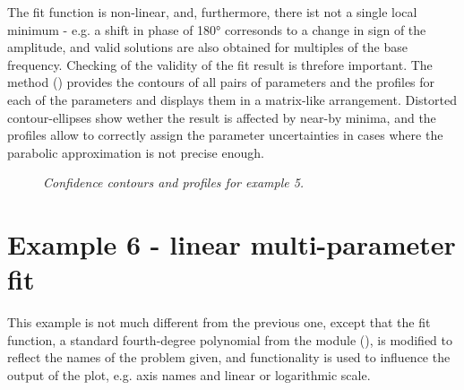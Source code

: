 \documentclass[a4paper,10pt,english]{sphinxmanual}
\begin{document}
The fit function is non-linear, and, furthermore, there ist not a single
local minimum - e.g. a shift in phase of 180° corresonds to a change in
sign of the amplitude, and valid solutions are also obtained for multiples
of the base frequency. Checking of the validity of the fit result is
threfore important. The method
{\hyperref[index:kafe.fit.Fit.plot_correlations]{\emph{}}} () provides the
contours of all pairs of parameters and the profiles for each of
the parameters and displays them in a matrix-like arrangement.
Distorted contour-ellipses show wether the result is affected
by near-by minima, and the profiles allow to correctly assign
the parameter uncertainties in cases where the parabolic
approximation is not precise enough.
\begin{figure}[htbp]
\centering
\capstart

\caption{\emph{Confidence contours and profiles for example 5.}}\end{figure}


\section{Example 6 - linear multi-parameter fit}
\label{index:example-6-linear-multi-parameter-fit}
This example is not much different from the previous one, except that
the fit function, a standard fourth-degree polynomial from the module
{\hyperref[index:module-function_library]{\emph{}}} (), is modified to reflect the names of the problem
given, and  functionality is used to influence the
output of the plot, e.g. axis names and linear or logarithmic scale.
\end{document}
